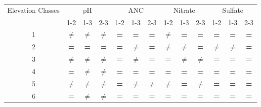 \begin{table}\scriptsize
\begin{center}
\begin{tabular}{ccccccccccccc}
\toprule
\multicolumn{1}{p{1cm}}{Elevation Classes}& \multicolumn{ 3}{c}{pH}                                                                & \multicolumn{ 3}{c}{ANC}                                         & \multicolumn{ 3}{c}{Nitrate}                                         & \multicolumn{ 3}{c}{Sulfate}                                 \\ \cline{2-13}\noalign{\smallskip}
                                                                       & \multicolumn{ 1}{c}{1-2} & 1-3                       & 2-3                      & 1-2             & 1-3                        & 2-3                      & 1-2                     & 1-3                      & 2-3                     & 1-2                       & 1-3                     & 2-3             \\  \cline{2-13}
\multicolumn{1}{c}{1}                                    & \textbf{$\neq$}               & \textbf{$\neq$}  & \textbf{$\neq$} & \textbf{=} & \textbf{=}            & \textbf{=}          & \textbf{$\neq$} & \textbf{=}         & \textbf{=}          & \textbf{=}          & \textbf{=}         & \textbf{=} \\ 
\multicolumn{1}{c}{2}                                    & \textbf{=}                        & \textbf{=}          & \textbf{=}          & \textbf{=} & \textbf{$\neq$}    & \textbf{=}          & \textbf{$\neq$} & \textbf{$\neq$} & \textbf{=}          & \textbf{$\neq$} & \textbf{$\neq$} & \textbf{=} \\ 
\multicolumn{1}{c}{3}                                    & \textbf{$\neq$}               & \textbf{$\neq$}  & \textbf{$\neq$} & \textbf{=} & \textbf{$\neq$}    & \textbf{=}          & \textbf{=}          & \textbf{$\neq$} & \textbf{$\neq$} & \textbf{=}          & \textbf{=}         & \textbf{=} \\ 
\multicolumn{1}{c}{4}                                    & \textbf{=}                        & \textbf{$\neq$}  & \textbf{$\neq$} & \textbf{=} & \textbf{=}             & \textbf{=}          & \textbf{=}          & \textbf{=}         & \textbf{=}          & \textbf{=}          & \textbf{=}         & \textbf{=} \\ 
\multicolumn{1}{c}{5}                                    & \textbf{$\neq$}               & \textbf{$\neq$}  & \textbf{$\neq$}  & \textbf{=} & \textbf{$\neq$}    & \textbf{$\neq$} & \textbf{$\neq$} & \textbf{=}          & \textbf{$\neq$} & \textbf{=}          & \textbf{=}         & \textbf{=} \\ 
\multicolumn{1}{c}{6}                                    & \textbf{=}                        & \textbf{$\neq$}  & \textbf{$\neq$}  & \textbf{=} & \textbf{=}            & \textbf{=}          & \textbf{=}          & \textbf{=}          & \textbf{=}         & \textbf{=}          & \textbf{=}         & \textbf{=} \\ 
\bottomrule
\end{tabular}
\end{center}
\end{table}
